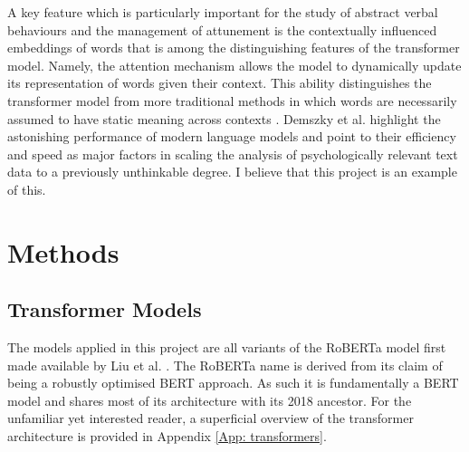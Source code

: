 \documentclass[12pt]{report}
\begin{document}
A key feature which is particularly important for the study of abstract verbal behaviours and the management of attunement is the contextually influenced embeddings of words that is among the distinguishing features of the transformer model.
Namely, the attention mechanism allows the model to dynamically update its representation of words given their context.
This ability distinguishes the transformer model from more traditional methods in which words are necessarily assumed to have static meaning across contexts \cite{Demszky2023}.
Demszky et al. \citeyear{Demszky2023} highlight the astonishing performance of modern language models and point to their efficiency and speed as major factors in scaling the analysis of psychologically relevant text data to a previously unthinkable degree.
I believe that this project is an example of this.

\section{Methods}

\subsection{Transformer Models}
The models applied in this project are all variants of the RoBERTa model first made available by Liu et al. \citeyear{roberta}.
The RoBERTa name is derived from its claim of being a robustly optimised BERT approach.
As such it is fundamentally a BERT model and shares most of its architecture with its 2018 ancestor.
For the unfamiliar yet interested reader, a superficial overview of the transformer architecture is provided in Appendix \ref{App: transformers}.
\end{document}
